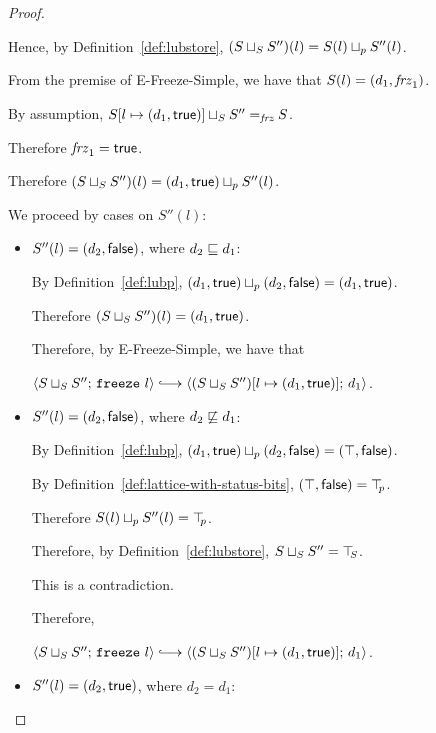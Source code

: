 \begin{proof}
\begin{itemize}
\begin{itemize}
        Hence, by Definition~\ref{def:lubstore},
        $(S \sqcup_{S} S'')(l) = S(l) \sqcup_p S''(l)$.

        From the premise of {\sc E-Freeze-Simple}, we have that
        $S(l) = (d_1, \mathit{frz}_1)$.

        By assumption, $S[l \mapsto (d_1, \textsf{true})] \sqcup_{S} S''
        =_{\textit{frz}} S$.

        Therefore $\mathit{frz}_1 = \textsf{true}$.

        Therefore $(S \sqcup_{S} S'')(l) =
        (d_1, \textsf{true}) \sqcup_p S''(l)$.
        
        We proceed by cases on $S''(l)$:
        \begin{itemize}
        \item $S''(l) = (d_2, \textsf{false})$, where $d_2 \sqsubseteq d_1$:

          By Definition~\ref{def:lubp},
          $(d_1, \textsf{true}) \sqcup_p (d_2, \textsf{false}) =
          (d_1, \textsf{true})$.

          Therefore $(S \sqcup_{S} S'')(l) =
          (d_1, \textsf{true})$.

          Therefore, by {\sc E-Freeze-Simple}, we have that

          $\config{\lubstore{S}{S''}}{\freeze{l}}
          \parstepsto
          \config{\extS{(\lubstore{S}{S''})}{l}{d_1}{\frozentrue}}{d_1}$.

        \item $S''(l) = (d_2, \textsf{false})$, where $d_2 \not \sqsubseteq d_1$:

          By Definition~\ref{def:lubp},
          $(d_1, \textsf{true}) \sqcup_p (d_2, \textsf{false})
          = (\top, \textsf{false})$.

          By Definition~\ref{def:lattice-with-status-bits},
          $(\top, \textsf{false}) = \top\hspace{-0.85mm}_{p}$.

          Therefore $S(l) \sqcup_p S''(l) = \top\hspace{-0.85mm}_{p}$.

          Therefore, by Definition~\ref{def:lubstore},
          $S \sqcup_{S} S'' = \top\hspace{-0.85mm}_{S}$.

          This is a contradiction.

          Therefore,

          $\config{\lubstore{S}{S''}}{\freeze{l}}
          \parstepsto
          \config{\extS{(\lubstore{S}{S''})}{l}{d_1}{\frozentrue}}{d_1}$.

        \item $S''(l) = (d_2, \textsf{true})$, where $d_2 = d_1$:


\end{itemize}
\end{itemize}
\end{itemize}
\end{proof}
